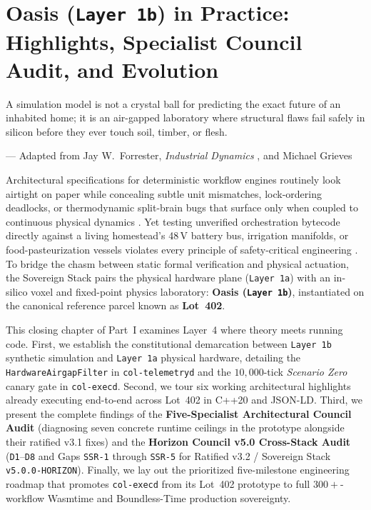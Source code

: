 \chapter{Oasis (\texttt{Layer 1b}) in Practice: Highlights, Specialist Council Audit, and Evolution}
\label{ch:oasis-council}

\epigraph{A simulation model is not a crystal ball for predicting the exact future of an inhabited home; it is an air-gapped laboratory where structural flaws fail safely in silicon before they ever touch soil, timber, or flesh.}{--- Adapted from Jay W.\ Forrester, \emph{Industrial Dynamics} \parencite{forrester1961}, and Michael Grieves \parencite{grieves2014digital}}

Architectural specifications for deterministic workflow engines routinely look airtight on paper while concealing subtle unit mismatches, lock-ordering deadlocks, or thermodynamic split-brain bugs that surface only when coupled to continuous physical dynamics \parencite{meadows2008,astrom2008feedback}. Yet testing unverified orchestration bytecode directly against a living homestead's 48\,V battery bus, irrigation manifolds, or food-pasteurization vessels violates every principle of safety-critical engineering \parencite{iec61508}. To bridge the chasm between static formal verification and physical actuation, the Sovereign Stack pairs the physical hardware plane (\texttt{Layer 1a}) with an in-silico voxel and fixed-point physics laboratory: \textbf{Oasis (\texttt{Layer 1b})}, instantiated on the canonical reference parcel known as \textbf{Lot~402}.

This closing chapter of Part~I examines Layer~4 where theory meets running code. First, we establish the constitutional demarcation between \texttt{Layer 1b} synthetic simulation and \texttt{Layer 1a} physical hardware, detailing the \texttt{HardwareAirgapFilter} in \texttt{col-telemetryd} and the $10{,}000$-tick \emph{Scenario Zero} canary gate in \texttt{col-execd}. Second, we tour six working architectural highlights already executing end-to-end across Lot~402 in C++20 and JSON-LD. Third, we present the complete findings of the \textbf{Five-Specialist Architectural Council Audit} (diagnosing seven concrete runtime ceilings in the prototype alongside their ratified v3.1 fixes) and the \textbf{Horizon Council v5.0 Cross-Stack Audit} (\texttt{D1}--\texttt{D8} and Gaps \texttt{SSR-1} through \texttt{SSR-5} for Ratified v3.2 / Sovereign Stack \texttt{v5.0.0-HORIZON}). Finally, we lay out the prioritized five-milestone engineering roadmap that promotes \texttt{col-execd} from its Lot~402 prototype to full $300+$-workflow Wasmtime and Boundless-Time production sovereignty.

